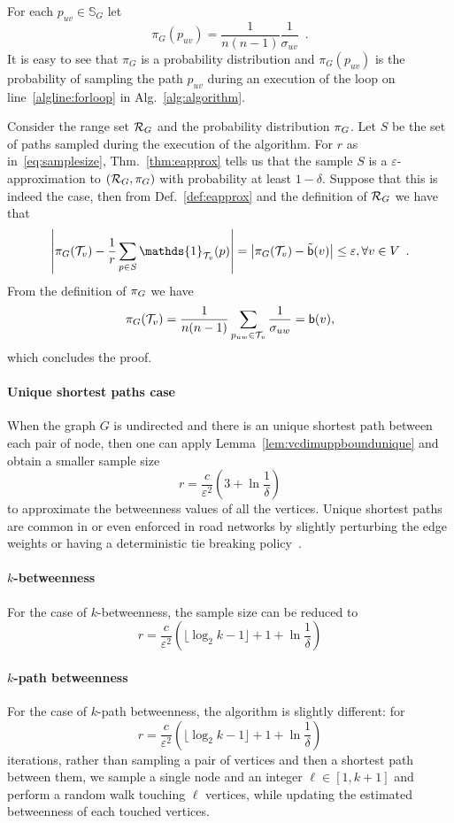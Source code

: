 \begin{IEEEproof}
  For each $p_{uv}\in\mathbb{S}_G$ let
  \[
  \pi_G(p_{uv})=\frac{1}{n(n-1)}\frac{1}{\sigma_{uv}}\enspace.
  \]
  It is easy to see that $\pi_G$ is a probability distribution and
  $\pi_G(p_{uv})$ is the probability of sampling the path $p_{uv}$ during an
  execution of the loop on line~\ref{algline:forloop} in
  Alg.~\ref{alg:algorithm}.
  
  Consider the range set $\mathcal{R}_G$ and the probability distribution $\pi_G$.
  Let $S$ be the set of paths sampled during the execution of the algorithm.
  For $r$ as in~\eqref{eq:samplesize}, Thm.~\ref{thm:eapprox} tells us that the sample $S$ is a
  $\varepsilon$-approximation to $(\mathcal{R}_G,\pi_G)$ with probability at least
  $1-\delta$. Suppose that this is indeed the case, then from
  Def.~\ref{def:eapprox} and the definition of $\mathcal{R}_G$ we have that
  \[
  \left|\prob_G(\mathcal{T}_v) - \frac{1}{r}\sum_{p\in
  S}\mathds{1}_{\mathcal{T}_v}(p)\right|=\left|\prob_G(\mathcal{T}_v) -
  \tilde\betw(v)\right|\le\varepsilon, \forall v\in
  V\enspace.
  \]
  From the definition of $\pi_G$ we have
  \[
  \pi_G(\mathcal{T}_v)=\frac{1}{n(n-1)}\sum_{p_{uw}\in\mathcal{T}_v}\frac{1}{\sigma_{uw}}=\mathsf{b}(v),
  \]
  which concludes the proof.
\end{IEEEproof}

\paragraph{Unique shortest paths case} When the graph $G$ is undirected and
there is an unique shortest path between each pair of node, then one can apply
Lemma~\ref{lem:vcdimuppboundunique} and obtain a smaller sample size
\[
  r= \frac{c}{\varepsilon^2}\left(3+\ln\frac{1}{\delta}\right)
\]
to approximate the betweenness values of all the vertices. Unique shortest
paths are common in or even enforced in road networks by
slightly perturbing the edge weights or having a deterministic tie breaking
policy~\citep{GeisbergerSS08}.

\paragraph{$k$-betweenness} For the case of $k$-betweenness, the sample size can
be reduced to 
\[ 
  r= \frac{c}{\varepsilon^2}\left(\lfloor\log_2 k-1\rfloor + 1 +\ln\frac{1}{\delta}\right)
\]

\paragraph{$k$-path betweenness}
For the case of $k$-path betweenness, the algorithm is slightly different:
for 
\[
  r= \frac{c}{\varepsilon^2}\left(\lfloor\log_2 k-1\rfloor + 1 +\ln\frac{1}{\delta}\right)
\]
iterations, rather than sampling a pair of vertices and then a shortest path
between them, we sample a single node and an integer $\ell\in[1,k+1]$ and
perform a random walk touching $\ell$ vertices, while updating the estimated
betweenness of each touched vertices.

